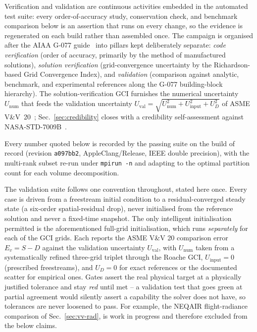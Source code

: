 \documentclass[journal,biblatex]{new-aiaa}
\begin{document}
Verification and validation are continuous activities embedded in the automated test suite: every order-of-accuracy study, conservation check, and benchmark comparison below is an assertion that runs on every change, so the evidence is regenerated on each build rather than assembled once. The campaign is organised after the AIAA G-077 guide~\cite{noauthor_guide_1998,oberkampf_verification_2010} into pillars kept deliberately separate: \emph{code verification} (order of accuracy, primarily by the method of manufactured solutions), \emph{solution verification} (grid-convergence uncertainty by the Richardson-based Grid Convergence Index), and \emph{validation} (comparison against analytic, benchmark, and experimental references along the G-077 building-block hierarchy). The solution-verification GCI furnishes the numerical uncertainty $U_{\mathrm{num}}$ that feeds the validation uncertainty $U_{\mathrm{val}}=\sqrt{U_{\mathrm{num}}^2+U_{\mathrm{input}}^2+U_D^2}$ of ASME V\&V~20~\cite{noauthor_standard_nodate,celik_procedure_2008}; Sec.~\ref{sec:credibility} closes with a credibility self-assessment against NASA-STD-7009B~\cite{noauthor_nasa_nodate}.

Every number quoted below is recorded by the passing suite on the build of record (revision \texttt{a097bb2}, AppleClang/Release, IEEE double precision), with the multi-rank subset re-run under \texttt{mpirun -n} and adapting to the optimal partition count for each volume decomposition.

The validation suite follows one convention throughout, stated here once. Every case is driven from a freestream initial condition to a residual-converged steady state (a six-order spatial-residual drop), never initialised from the reference solution and never a fixed-time snapshot. The only intelligent initialisation permitted is the aforementioned full-grid initialisation, which runs \emph{separately} for each of the GCI grids. Each reports the ASME V\&V 20 comparison error $E_v=S-D$ against the validation uncertainty $U_{\mathrm{val}}$, with $U_{\mathrm{num}}$ taken from a systematically refined three-grid triplet through the Roache GCI, $U_{\mathrm{input}}=0$ (prescribed freestreams), and $U_D=0$ for exact references or the documented scatter for empirical ones. Gates assert the real physical target at a physically justified tolerance and stay \emph{red} until met -- a validation test that goes green at partial agreement would silently assert a capability the solver does not have, so tolerances are never loosened to pass. For example, the NEQAIR flight-radiance comparison of Sec.~\ref{sec:vv-rad}, is work in progress and therefore excluded from the below claims.
\end{document}
